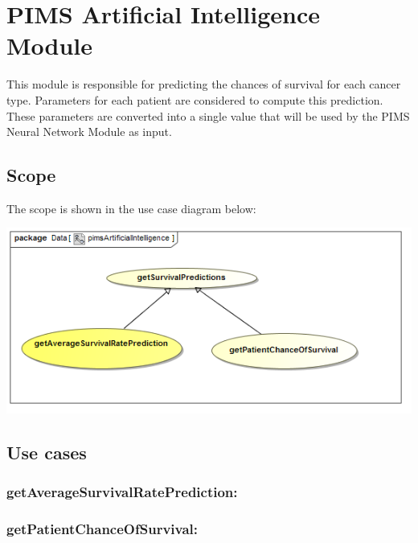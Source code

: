 \section{PIMS Artificial Intelligence Module}
This module is responsible for predicting the chances of survival for each cancer type. Parameters for each patient are considered to compute this prediction. These parameters are converted into a single value that will be used by the PIMS Neural Network Module as input. \par 

\subsection{Scope}
The scope is shown in the use case diagram below: \par
\includegraphics[width=0.75\linewidth]{./Graphics/pimsAI/pimsArtificialIntelligence}

\subsection{Use cases}
	\subsubsection{getAverageSurvivalRatePrediction:} 
	\subsubsection{getPatientChanceOfSurvival:}